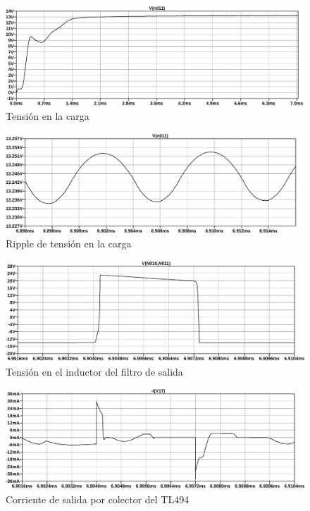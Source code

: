 \begin{figure}[ht]
    \centering
    \includegraphics[width=\textwidth]{images/sim/21.pdf}
    \caption{Tensión en la carga}
    \label{fig:sim:21}
\end{figure}

\begin{figure}[ht]
    \centering
    \includegraphics[width=\textwidth]{images/sim/21-ripple.pdf}
    \caption{Ripple de tensión en la carga}
    \label{fig:sim:21ripple}
\end{figure}

\begin{figure}[ht]
    \centering
    \includegraphics[width=\textwidth]{images/sim/22.pdf}
    \caption{Tensión en el inductor del filtro de salida}
    \label{fig:sim:22}
\end{figure}

\begin{figure}[ht]
    \centering
    \includegraphics[width=\textwidth]{images/sim/23.pdf}
    \caption{Corriente de salida por colector del TL494}
    \label{fig:sim:23}
\end{figure}

